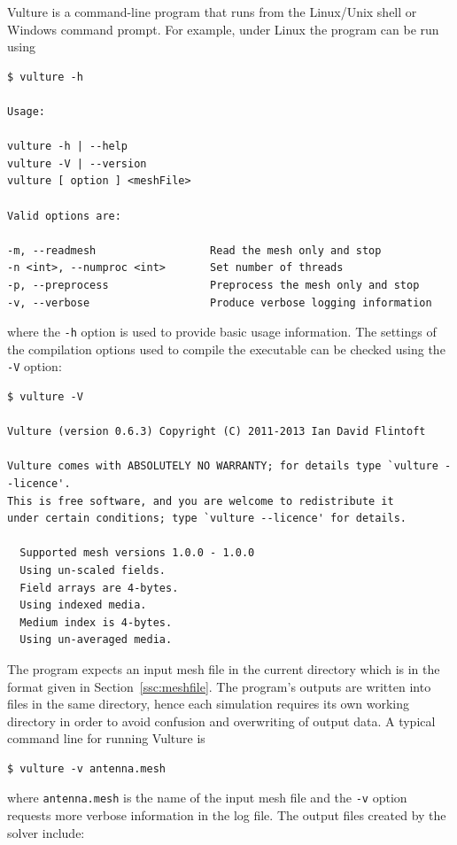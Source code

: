 \documentclass[onecolumn,a4paper]{article}
\numberwithin{equation}{section}
\begin{document}
Vulture is a command-line program that runs from the Linux/Unix shell or Windows command prompt.
For example, under Linux the program can be run using 
\begin{verbatim}
$ vulture -h

Usage:

vulture -h | --help
vulture -V | --version
vulture [ option ] <meshFile>

Valid options are:

-m, --readmesh                  Read the mesh only and stop
-n <int>, --numproc <int>       Set number of threads
-p, --preprocess                Preprocess the mesh only and stop
-v, --verbose                   Produce verbose logging information
\end{verbatim}
where the \texttt{-h} option is used to provide basic usage information. The 
settings of the compilation options used to compile the executable can be checked
using the \texttt{-V} option:
\begin{verbatim}
$ vulture -V

Vulture (version 0.6.3) Copyright (C) 2011-2013 Ian David Flintoft

Vulture comes with ABSOLUTELY NO WARRANTY; for details type `vulture --licence'.
This is free software, and you are welcome to redistribute it
under certain conditions; type `vulture --licence' for details.

  Supported mesh versions 1.0.0 - 1.0.0
  Using un-scaled fields.
  Field arrays are 4-bytes.
  Using indexed media.
  Medium index is 4-bytes.
  Using un-averaged media.

\end{verbatim}
The program expects an input mesh file in the current directory which is in the format given in Section~\ref{ssc:meshfile}. 
The program's outputs are
written into files in the same directory, hence each simulation requires its own working directory in order
to avoid confusion and overwriting of output data. A typical command line for running Vulture is
\begin{verbatim}
$ vulture -v antenna.mesh
\end{verbatim}
where \texttt{antenna.mesh} is the name of the input mesh file and the \texttt{-v} option requests more
verbose information in the log file. The output files created by the solver include:
\end{document}
